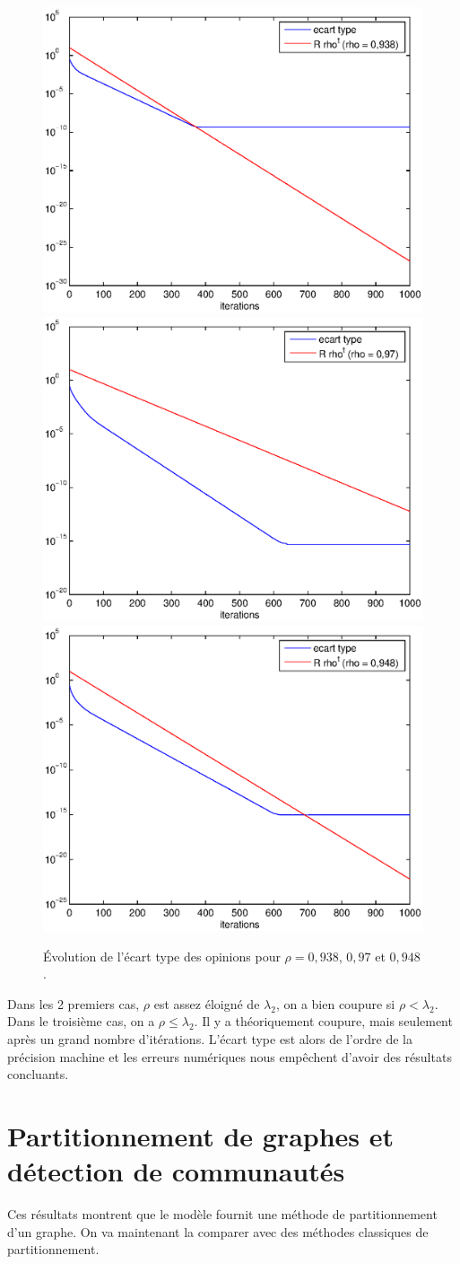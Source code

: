\documentclass[12pt]{article}
\begin{document}
\begin{figure}[htb]
	\begin{center}
		\includegraphics[width=.4\textwidth]{var_rho_0938}
		\includegraphics[width=.4\textwidth]{var_rho_097}
		\includegraphics[width=.5\textwidth]{var_rho_0948}
		\caption{Évolution de l'écart type des opinions pour
 $\rho = 0,938$, $0,97$ et $0,948$.}
		\label{num_coupure}
	\end{center}
\end{figure}

Dans les 2 premiers cas, $\rho$ est assez éloigné de $\lambda_2$, on a
bien coupure si $\rho < \lambda_2$. Dans le troisième cas, on a $\rho
\leq \lambda_2$. Il y a théoriquement coupure, mais seulement après un
grand nombre d'itérations. L'écart type est alors de l'ordre de la
précision machine et les erreurs numériques nous empêchent d'avoir des
résultats concluants.

\section{Partitionnement de graphes et détection de communautés}
Ces résultats montrent que le modèle fournit une méthode de
partitionnement d'un graphe. On va maintenant la comparer avec des
méthodes classiques de partitionnement.
\end{document}
